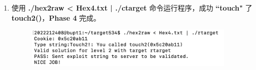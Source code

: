 \begin{enumerate}
\begin{figure}[htbp]
                \end{figure}
            \newpage
            \item 使用 \textbf{./hex2raw < Hex4.txt | ./ctarget} 命令运行程序，成功 \textbf{``touch"} 了 \textbf{touch2()}，\textbf{Phase 4} 完成。   
                \begin{figure}[htbp]
                    \hspace*{1.5cm}
                    \includegraphics*[width = 10cm]{s4_3.png}
                \end{figure}
        \end{enumerate}

